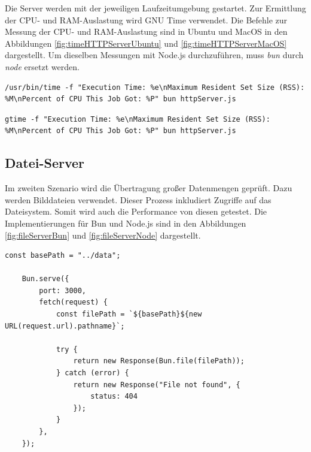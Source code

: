 \noindent
Die Server werden mit der jeweiligen Laufzeitumgebung gestartet. Zur Ermittlung der CPU- und RAM-Auslastung wird GNU Time verwendet. Die Befehle zur Messung der CPU- und RAM-Auslastung sind in Ubuntu und MacOS in den Abbildungen \ref{fig:timeHTTPServerUbuntu} und \ref{fig:timeHTTPServerMacOS} dargestellt. Um dieselben Messungen mit Node.js durchzuführen, muss \textit{bun} durch \textit{node} ersetzt werden.

\begin{lstlisting}[caption={[CPU- und RAM-Messung auf dem Desktop-PC]CPU- und RAM-Messung auf dem Desktop-PC\\\textit{Quelle: Eigene Darstellung}},label={fig:timeHTTPServerUbuntu}]
	/usr/bin/time -f "Execution Time: %e\nMaximum Resident Set Size (RSS): %M\nPercent of CPU This Job Got: %P" bun httpServer.js
\end{lstlisting}

\begin{lstlisting}[caption={[CPU- und RAM-Messung auf dem MacBook Pro]CPU- und RAM-Messung auf dem MacBook Pro\\\textit{Quelle: Eigene Darstellung}},label={fig:timeHTTPServerMacOS}]
	gtime -f "Execution Time: %e\nMaximum Resident Set Size (RSS): %M\nPercent of CPU This Job Got: %P" bun httpServer.js
\end{lstlisting}


\subsection{Datei-Server} \label{subsec:fileServer}
Im zweiten Szenario wird die Übertragung großer Datenmengen geprüft. Dazu werden Bilddateien verwendet. Dieser Prozess inkludiert Zugriffe auf das Dateisystem. Somit wird auch die Performance von diesen getestet. Die Implementierungen für Bun und Node.js sind in den Abbildungen \ref{fig:fileServerBun} und \ref{fig:fileServerNode} dargestellt.

\begin{lstlisting}[caption={[Datei-Server Bun]Datei-Server Bun\\\textit{Quelle: Eigene Darstellung}},label={fig:fileServerBun}]
	const basePath = "../data";
	
	Bun.serve({
		port: 3000,
		fetch(request) {
			const filePath = `${basePath}${new URL(request.url).pathname}`;
			
			try {
				return new Response(Bun.file(filePath));
			} catch (error) {
				return new Response("File not found", {
					status: 404
				});
			}
		},
	});
\end{lstlisting}


